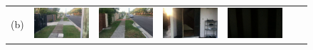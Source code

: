 \documentclass[letterpaper, 10 pt, conference]{ieeeconf}  %
\begin{document}
\begin{figure}
\begin{tabular*}{\textwidth}{ccccccc}
 (b) &
 \includegraphics[width=\imgW,height=\imgH]{rio-r1} &
 \includegraphics[width=\imgW,height=\imgH]{rio-r2} &
 \includegraphics[width=\imgW,height=\imgH]{rio-r4} &
 \includegraphics[width=\imgW,height=\imgH]{rio-r5} &

\end{tabular*}
\end{figure}
\end{document}
